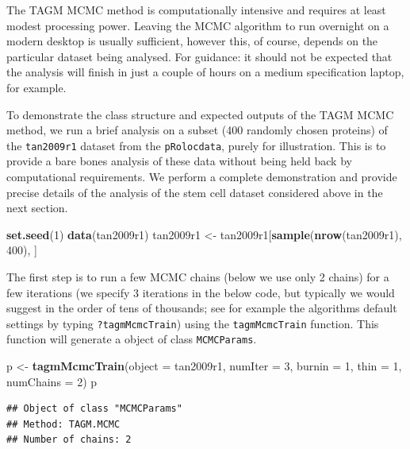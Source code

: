 \documentclass[
]{article}
\newenvironment{Shaded}{\begin{snugshade}}{\end{snugshade}}
\newcommand{\DataTypeTok}[1]{\textcolor[rgb]{0.13,0.29,0.53}{#1}}
\newcommand{\DecValTok}[1]{\textcolor[rgb]{0.00,0.00,0.81}{#1}}
\newcommand{\KeywordTok}[1]{\textcolor[rgb]{0.13,0.29,0.53}{\textbf{#1}}}
\newcommand{\NormalTok}[1]{#1}
\newcommand{\StringTok}[1]{\textcolor[rgb]{0.31,0.60,0.02}{#1}}
\begin{document}
The TAGM MCMC method is computationally intensive and requires at least
modest processing power. Leaving the MCMC algorithm to run overnight on
a modern desktop is usually sufficient, however this, of course, depends
on the particular dataset being analysed. For guidance: it should not be
expected that the analysis will finish in just a couple of hours on a
medium specification laptop, for example.

To demonstrate the class structure and expected outputs of the TAGM MCMC
method, we run a brief analysis on a subset (400 randomly chosen
proteins) of the \texttt{tan2009r1} dataset from the
\texttt{pRolocdata}, purely for illustration. This is to provide a bare
bones analysis of these data without being held back by computational
requirements. We perform a complete demonstration and provide precise
details of the analysis of the stem cell dataset considered above in the
next section.

\begin{Shaded}
\begin{Highlighting}[]
\KeywordTok{set.seed}\NormalTok{(}\DecValTok{1}\NormalTok{)}
\KeywordTok{data}\NormalTok{(tan2009r1)}
\NormalTok{tan2009r1 <-}\StringTok{ }\NormalTok{tan2009r1[}\KeywordTok{sample}\NormalTok{(}\KeywordTok{nrow}\NormalTok{(tan2009r1), }\DecValTok{400}\NormalTok{), ]}
\end{Highlighting}
\end{Shaded}

The first step is to run a few MCMC chains (below we use only 2 chains)
for a few iterations (we specify 3 iterations in the below code, but
typically we would suggest in the order of tens of thousands; see for
example the algorithms default settings by typing
\texttt{?tagmMcmcTrain}) using the \texttt{tagmMcmcTrain} function. This
function will generate a object of class \texttt{MCMCParams}.

\begin{Shaded}
\begin{Highlighting}[]
\NormalTok{p <-}\StringTok{ }\KeywordTok{tagmMcmcTrain}\NormalTok{(}\DataTypeTok{object =}\NormalTok{ tan2009r1, }\DataTypeTok{numIter =} \DecValTok{3}\NormalTok{,}
                   \DataTypeTok{burnin =} \DecValTok{1}\NormalTok{, }\DataTypeTok{thin =} \DecValTok{1}\NormalTok{, }\DataTypeTok{numChains =} \DecValTok{2}\NormalTok{)}
\NormalTok{p}
\end{Highlighting}
\end{Shaded}

\begin{verbatim}
## Object of class "MCMCParams"
## Method: TAGM.MCMC 
## Number of chains: 2
\end{verbatim}
\end{document}
